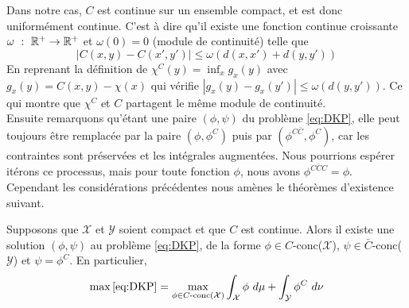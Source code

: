 \documentclass[a4paper,12pt]{article}
\begin{document}
Dans notre cas, $C$ est continue sur un ensemble compact, et est donc uniformément continue. C'est à dire qu'il existe une fonction continue croissante $\omega\ :\ \mathbb{R}^+\rightarrow\mathbb{R}^+$ et $\omega(0)=0$ (module de continuité) telle que 
$$
\left|C(x,y) - C(x',y')\right| \leq \omega(d(x,x') + d(y,y'))
$$
En reprenant la définition de $\chi^C(y) = \inf_x g_x(y)$ avec $g_x(y) = C(x,y)-\chi(x)$ qui vérifie $|g_x(y)-g_x(y')|\leq\omega(d(y,y'))$. Ce qui montre que $\chi^C$ et $C$ partagent le même module de continuité. \\

Ensuite remarquons qu'étant une paire $(\phi,\psi)$ du problème \eqref{eq:DKP}, elle peut toujours être remplacée par la paire $(\phi,\phi^C)$ puis par $(\phi^{C\bar{C}},\phi^C)$, car les contraintes sont préservées et les intégrales augmentées. 
Nous pourrions espérer itérons ce processus, mais pour toute fonction $\phi$, nous avons $\phi^{C\bar{C}C} = \phi$. Cependant les considérations précédentes nous amènes le théorèmes d'existence suivant. 
\begin{theoreme}{}
Supposons que $\mathcal{X}$ et $\mathcal{Y}$ soient compact et que $C$ est continue. Alors il existe une solution $(\phi,\psi)$ au problème \eqref{eq:DKP}, de la forme $\phi\in C$-conc($\mathcal{X}$), $\psi\in \bar{C}$-conc($\mathcal{Y}$) et $\psi=\phi^C$. En particulier, 
\begin{align}
\max\eqref{eq:DKP} = \max_{\phi\in C\text{-conc}(\mathcal{X})}\int_{\mathcal{X}}\phi\ d\mu +\int_{\mathcal{Y}} \phi^C\ d\nu
\label{eq:existenceDKP}
\end{align}
\end{theoreme}
\end{document}
